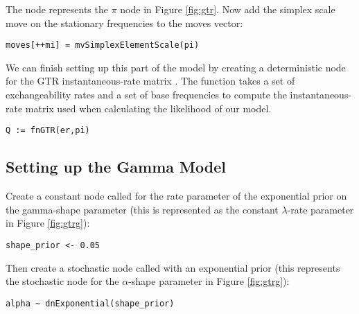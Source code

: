 The node  represents the $\pi$ node in Figure \ref{fig:gtr}.
Now add the simplex scale move on the stationary frequencies to the moves vector:
{\tt \small \begin{snugshade*}
\begin{lstlisting}
moves[++mi] = mvSimplexElementScale(pi)  
\end{lstlisting}
\end{snugshade*}}

We can finish setting up this part of the model by creating a deterministic node for the GTR instantaneous-rate matrix . 
The  function takes a set of exchangeability rates and a set of base frequencies to compute the instantaneous-rate matrix used when calculating the likelihood of our model.
{\tt \begin{snugshade*}
\begin{lstlisting}
Q := fnGTR(er,pi)
\end{lstlisting}
\end{snugshade*}}


\subsection{Setting up the Gamma Model}

Create a constant node called  for the rate parameter of the exponential prior on the gamma-shape parameter (this is represented as the constant $\lambda$-rate parameter in Figure \ref{fig:gtrg}):
{\tt\begin{snugshade*}
\begin{lstlisting}
shape_prior <- 0.05                                                                             
\end{lstlisting}
\end{snugshade*}}

Then create a stochastic node called  with an exponential prior (this represents the stochastic node for the $\alpha$-shape parameter in Figure \ref{fig:gtrg}):
{\tt\begin{snugshade*}
\begin{lstlisting}
alpha ~ dnExponential(shape_prior)
\end{lstlisting}
\end{snugshade*}}

